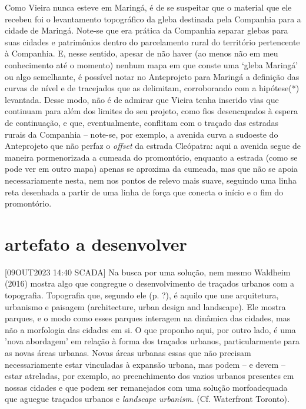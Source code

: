 \documentclass[12pt, a4paper]{book} %
\begin{document}
        Como Vieira nunca esteve em Maringá, é de se suspeitar que o material que ele recebeu foi o levantamento topográfico da gleba destinada pela Companhia para a cidade de Maringá. Note-se que era prática da Companhia separar glebas para suas cidades e patrimônios dentro do parcelamento rural do território pertencente à Companhia. E, nesse sentido, apesar de não haver (ao menos não em meu conhecimento até o momento) nenhum mapa em que conste uma `gleba Maringá' ou algo semelhante, é possível notar no Anteprojeto para Maringá a definição das curvas de nível e de tracejados que as delimitam, corroborando com a hipótese(*) levantada. Desse modo, não é de admirar que Vieira tenha inserido vias que continuam para além dos limites do seu projeto, como fios desencapados à espera de continuação, e que, eventualmente, conflitam com o traçado das estradas rurais da Companhia – note-se, por exemplo, a avenida curva a sudoeste do Anteprojeto que não perfaz o \textit{offset} da estrada Cleópatra: aqui a avenida segue de maneira pormenorizada a cumeada do promontório, enquanto a estrada (como se pode ver em outro mapa) apenas se aproxima da cumeada, mas que não se apoia necessariamente nesta, nem nos pontos de relevo mais suave, seguindo uma linha reta desenhada a partir de uma linha de força que conecta o início e o fim do promontório.

        \chapter[A escolha de uma solução]{artefato a desenvolver}

        [09OUT2023 14:40 SCADA] Na busca por uma solução, nem mesmo Waldheim (2016) mostra algo que congregue o desenvolvimento de traçados urbanos com a topografia. Topografia que, segundo ele (p. ?), é aquilo que une arquitetura, urbanismo e paisagem (architecture, urban design and landscape). Ele mostra parques, e o modo como esses parques interagem na dinâmica das cidades, mas não a morfologia das cidades em si.
        O que proponho aqui, por outro lado, é uma 'nova abordagem' em relação à forma dos traçados urbanos, particularmente para as novas áreas urbanas. Novas áreas urbanas essas que não precisam necessariamente estar vinculadas à expansão urbana, mas podem – e devem – estar atreladas, por exemplo, ao preenchimento dos vazios urbanos presentes em nossas cidades e que podem ser remanejados com uma solução morfoadequada que aguegue traçados urbanos e \textit{landscape urbanism}. (Cf. Waterfront Toronto).
\end{document}
